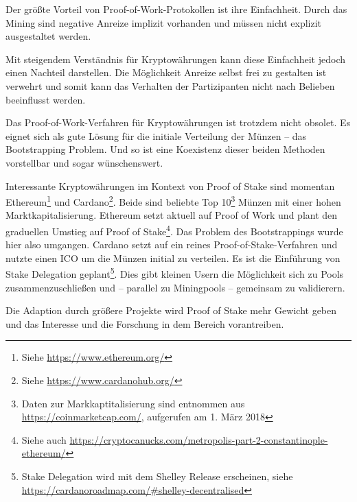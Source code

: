 Der größte Vorteil von Proof-of-Work-Protokollen ist ihre Einfachheit. Durch das Mining sind negative Anreize implizit vorhanden und müssen nicht explizit ausgestaltet werden.

Mit steigendem Verständnis für Kryptowährungen kann diese Einfachheit jedoch einen Nachteil darstellen. Die Möglichkeit Anreize selbst frei zu gestalten ist verwehrt und somit kann das Verhalten der Partizipanten nicht  nach Belieben beeinflusst werden.

Das Proof-of-Work-Verfahren für Kryptowährungen ist trotzdem nicht obsolet. Es eignet sich als gute Lösung für die initiale Verteilung der Münzen -- das Bootstrapping Problem.
Und so ist eine Koexistenz dieser beiden Methoden vorstellbar und sogar wünschenswert.

Interessante Kryptowährungen im Kontext von Proof of Stake sind momentan Ethereum\footnote{Siehe \url{https://www.ethereum.org/}} und Cardano\footnote{Siehe \url{https://www.cardanohub.org/}}. 
Beide sind beliebte Top 10\footnote{Daten zur Markkaptitalisierung sind entnommen aus \url{https://coinmarketcap.com/}, aufgerufen am 1. März 2018} Münzen mit einer hohen Marktkapitalisierung.
Ethereum setzt aktuell auf Proof of Work und plant den graduellen Umstieg auf Proof of Stake\footnote{Siehe auch \url{https://cryptocanucks.com/metropolis-part-2-constantinople-ethereum/}}. Das Problem des Bootstrappings wurde hier also umgangen. Cardano setzt auf ein reines Proof-of-Stake-Verfahren und nutzte einen ICO um die Münzen initial zu verteilen. Es ist die Einführung von Stake Delegation geplant\footnote{Stake Delegation wird mit dem Shelley Release erscheinen, siehe \url{https://cardanoroadmap.com/\#shelley-decentralised}}. Dies gibt kleinen Usern die Möglichkeit sich zu Pools zusammenzuschließen und -- parallel zu Miningpools -- gemeinsam zu validierern.

Die Adaption durch größere Projekte wird Proof of Stake mehr Gewicht geben und das Interesse und die Forschung in dem Bereich vorantreiben.
